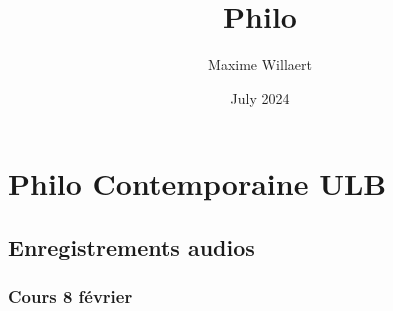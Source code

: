 \documentclass{report}
\title{Philo}
\author{Maxime Willaert}
\date{July 2024}
\theoremstyle{definition}
\begin{document}
\maketitle

\tableofcontents

\part{Philo Contemporaine ULB}

\chapter{Enregistrements audios}

\section{Cours 8 février}
\end{document}
